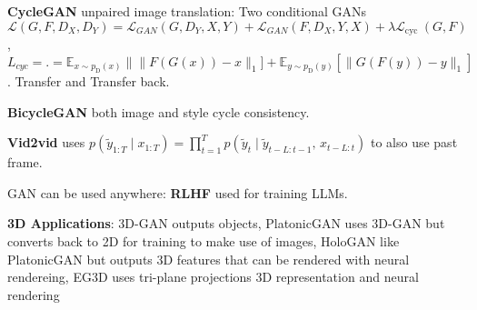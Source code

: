 \textbf{CycleGAN} unpaired image translation: Two conditional GANs \(\mathcal{L}(G, F, D_{X}, D_{Y})=\mathcal{L}_{G A N}(G, D_{Y}, X, Y)+\mathcal{L}_{G A N}(F, D_{X}, Y, X)+\lambda \mathcal{L}_{\text {cyc }}(G, F)\), \(L_{cyc} = .=\mathbb{E}_{x \sim p_{\text {D}}(x)}\|\| F(G(x))-x \|_{1}]+\mathbb{E}_{y \sim p_{\text {D}}(y)}[\|G(F(y))-y\|_{1}]\). Transfer and Transfer back.

\textbf{BicycleGAN} both image and style cycle consistency.

\textbf{Vid2vid} uses $p(\tilde{y}_{1:T} \mid x_{1:T}) = \prod_{t=1}^{T} p(\tilde{y}_t \mid \tilde{y}_{t-L:t-1}, \, x_{t-L:t})$ to also use past frame.


GAN can be used anywhere: \textbf{RLHF} used for training LLMs.

\textbf{3D Applications}: 3D-GAN outputs objects, PlatonicGAN uses 3D-GAN but converts back to 2D for training to make use of images, HoloGAN like PlatonicGAN but outputs 3D features that can be rendered with neural rendereing, EG3D uses tri-plane projections 3D representation and neural rendering

